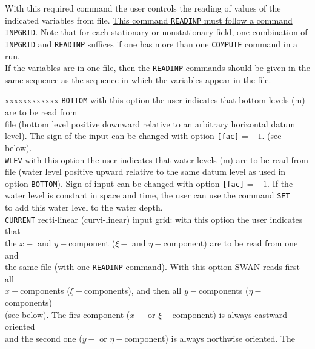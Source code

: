\documentclass[12pt]{book}
\begin{document}
\noindent
With this required command the user controls the reading of values of the indicated variables from file.
\underline{This command {\tt READINP} must follow a command {\tt INPGRID}}. Note that for each stationary or nonstationary
field, one combination of {\tt INPGRID} and {\tt READINP} suffices if one has more than one {\tt COMPUTE} command in a run.
\\[2ex]
\noindent
If the variables are in one file, then the {\tt READINP} commands should be given in the same sequence as the sequence in
which the variables appear in the file.
\begin{tabbing}
xxxxxxxxxxxx\= \kill
{\tt BOTTOM}        \> with this option the user indicates that bottom levels (m) are to be read from\+\\
                       file (bottom level positive downward relative to an arbitrary horizontal datum\\
                       level). The sign of the input can be changed with option {\tt [fac]} = $-1$. (see below).\-\\
{\tt WLEV}          \> with this option the user indicates that water levels (m) are to be read from\+\\
                       file (water level positive upward relative to the same datum level as used in\\
                       option {\tt BOTTOM}). Sign of input can be changed with option {\tt [fac]} = $-1$. If the\\
                       water level is constant in space and time, the user can use the command {\tt SET}\\
                       to add this water level to the water depth.\-\\
{\tt CURRENT}       \> recti-linear (curvi-linear) input grid: with this option the user indicates that\+\\
                       the $x-$ and $y-$component ($\xi-$ and $\eta-$component) are to be read from one and\\
                       the same file (with one {\tt READINP} command). With this option SWAN reads first all\\
                       $x-$components ($\xi-$components), and then all $y-$components ($\eta-$components)\\
                       (see below). The firs component ($x-$ or $\xi-$component) is always eastward oriented\\
                       and the second one ($y-$ or $\eta-$component) is always northwise oriented. The\\

\end{tabbing}
\end{document}

